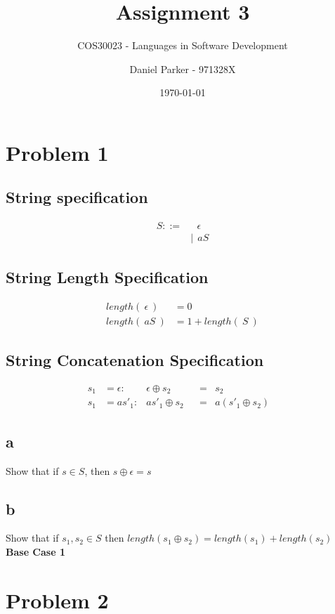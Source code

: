\documentclass[11pt, numbers=endperiod, parskip=half]{scrartcl}
\title{Assignment 3}
\subtitle{COS30023 - Languages in Software Development}
\author{Daniel Parker - 971328X}
\date{\today}
\begin{document}
\maketitle

\section{Problem 1}
\subsection{String specification}
\begin{align*}
S ::=& \ \ \ \epsilon \\
&|\ \ aS
\end{align*}
\subsection{String Length Specification}

\begin{align*}
length(\ \epsilon\ ) &= 0 \\
length(\ aS\ ) &= 1 + length(\ S\ )
\end{align*}

\subsection{String Concatenation Specification}
\begin{align*}
s_1 &= \epsilon: & \epsilon \oplus s_2 & &= &s_2 &\\
s_1 &= as'_1: & as'_1 \oplus s_2 & &= &a(s'_1 \oplus s_2)
\end{align*}

\subsection{a}
Show that if \(s \in S\), then \(s \oplus \epsilon = s\)
\subsection{b}
Show that if \(s_1, s_2 \in S\) then \(length(s_1 \oplus s_2) = length(s_1) + length(s_2)\)\\
\textbf{Base Case 1}\\
\(\)

\section{Problem 2}
\inputminted{prolog}{list_check.pl}
\end{document}
